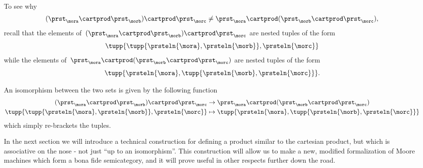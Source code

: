 To see why
\begin{equation}
    \label{eq:assoc-fails1}
    (\prst_{\mora} \cartprod \prst_{\morb}) \cartprod \prst_{\morc} \neq \prst_{\mora} \cartprod (\prst_{\morb} \cartprod \prst_{\morc}),
\end{equation}
recall that the elements of~$(\prst_{\mora} \cartprod \prst_{\morb}) \cartprod \prst_{\morc}$ are nested tuples of the form
\begin{equation*}
    \tupp{ \tupp{\prsteln{\mora}, \prsteln{\morb}}, \prsteln{\morc} }
\end{equation*}
while the elements of~$\prst_{\mora} \cartprod (\prst_{\morb} \cartprod \prst_{\morc})$ are nested tuples of the form
\begin{equation*}
    \tupp{\prsteln{\mora}, \tupp{\prsteln{\morb}, \prsteln{\morc}} }.
\end{equation*}

An isomorphism between the two sets is given by the following function
\begin{equation}
    \label{eq:assoc-fails2}
    \begin{aligned}
        (\prst_{\mora} \cartprod \prst_{\morb}) \cartprod \prst_{\morc}   & \to \prst_{\mora} \cartprod (\prst_{\morb} \cartprod \prst_{\morc}) \\
        \tupp{ \tupp{\prsteln{\mora}, \prsteln{\morb}}, \prsteln{\morc} } & \mapsto \tupp{\prsteln{\mora}, \tupp{\prsteln{\morb}, \prsteln{\morc}} }
    \end{aligned}
\end{equation}
which simply re-brackets the tuples.

In the next section we will introduce a technical construction for defining a product similar to the cartesian product, but which is associative on the nose - not just ``up to an isomorphism''.
This construction will allow us to make a new, modified formalization of Moore machines which form a bona fide semicategory, and it will prove useful in other respects further down the road.
